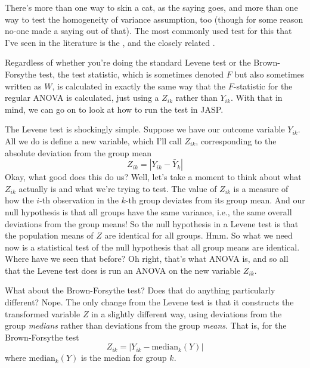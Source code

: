 There's more than one way to skin a cat, as the saying goes, and more than one way to test the homogeneity of variance assumption, too (though for some reason no-one made a saying out of that). The most commonly used test for this that I've seen in the literature is the  \parencite{Levene1960}, and the closely related  \parencite{BrownForsythe1974}. 

Regardless of whether you're doing the standard Levene test or the Brown-Forsythe test, the test statistic, which is sometimes denoted $F$ but also sometimes written as $W$, is  calculated in exactly the same way that the $F$-statistic for the regular ANOVA is calculated, just using a $Z_{ik}$ rather than $Y_{ik}$. With that in mind, we can go on to look at how to run the test in JASP.

\vspace{0.5cm}
\begin{mdframed}[style=MyFrame,nobreak=false]
The Levene test is shockingly simple. Suppose we have our outcome variable $Y_{ik}$. All we do is define a new variable, which I'll call $Z_{ik}$, corresponding to the absolute deviation from the group mean
$$
Z_{ik} = \left| Y_{ik} - \bar{Y}_k \right|
$$
Okay, what good does this do us? Well, let's take a moment to think about what $Z_{ik}$ actually is and what we're trying to test. The value of $Z_{ik}$ is a measure of how the $i$-th observation in the $k$-th group deviates from its group mean. And our null hypothesis is that all groups have the same variance, i.e., the same overall deviations from the group means! So the null hypothesis in a Levene test is that the population means of $Z$ are identical for all groups. Hmm. So what we need now is a statistical test of the null hypothesis that all group means are identical. Where have we seen that before? Oh right, that's what ANOVA is, and so all that the Levene test does is run an ANOVA on the new variable $Z_{ik}$. 

What about the Brown-Forsythe test? Does that do anything particularly different? Nope. The only change from the Levene test is that it constructs the transformed variable $Z$ in a slightly different way, using deviations from the group {\it medians} rather than deviations from the group {\it means}. That is, for the Brown-Forsythe test 
$$
Z_{ik} = \left| Y_{ik} - \mbox{median}_k(Y) \right|
$$
where $\mbox{median}_k(Y)$ is the median for group $k$. 
\end{mdframed}


